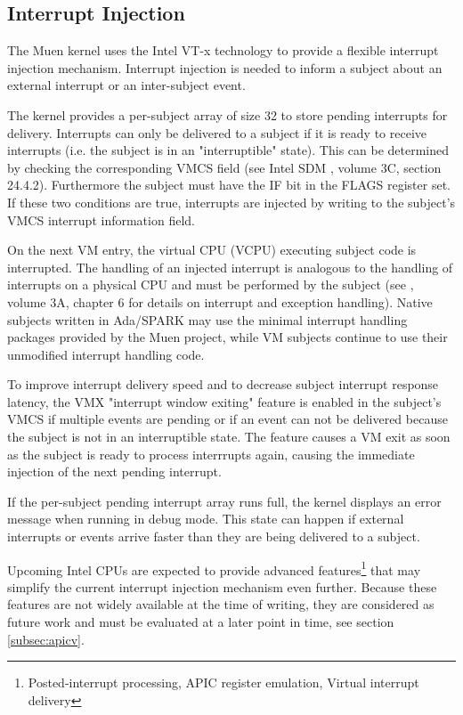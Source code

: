 \subsection{Interrupt Injection}\label{subsec:int-injection}
The Muen kernel uses the Intel VT-x technology to provide a flexible interrupt
injection mechanism. Interrupt injection is needed to inform a subject about an
external interrupt or an inter-subject event.

The kernel provides a per-subject array of size 32 to store pending interrupts
for delivery.  Interrupts can only be delivered to a subject if it is ready to
receive interrupts (i.e. the subject is in an "interruptible" state). This can
be determined by checking the corresponding VMCS field (see Intel SDM
\cite{IntelSDM}, volume 3C, section 24.4.2). Furthermore the subject must have
the IF bit in the FLAGS register set. If these two conditions are true,
interrupts are injected by writing to the subject's VMCS interrupt information
field.

On the next VM entry, the virtual CPU (VCPU) executing subject code
is interrupted. The handling of an injected interrupt is analogous to the
handling of interrupts on a physical CPU and must be performed by the subject
(see \cite{IntelSDM}, volume 3A, chapter 6 for details on interrupt and
exception handling). Native subjects written in Ada/SPARK may use the minimal
interrupt handling packages provided by the Muen project, while VM subjects
continue to use their unmodified interrupt handling code.

To improve interrupt delivery speed and to decrease subject interrupt response
latency, the VMX "interrupt window exiting" feature is enabled in the subject's
VMCS if multiple events are pending or if an event can not be delivered because
the subject is not in an interruptible state. The feature causes a VM exit as
soon as the subject is ready to process interrrupts again, causing the immediate
injection of the next pending interrupt.

If the per-subject pending interrupt array runs full, the kernel displays an
error message when running in debug mode. This state can happen if external
interrupts or events arrive faster than they are being delivered to a subject.

Upcoming Intel CPUs are expected to provide advanced
features\footnote{Posted-interrupt processing, APIC register emulation, Virtual
interrupt delivery} that may simplify the current interrupt injection mechanism
even further. Because these features are not widely available at the time of
writing, they are considered as future work and must be evaluated at a later
point in time, see section \ref{subsec:apicv}.
